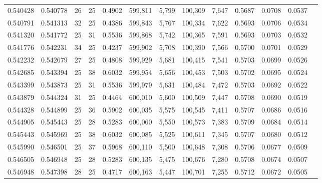 \begin{tabular}{rrrrrrrrrrrrr}
0.540428 & 0.540778 &    26 &  25 &                                     0.4902 & 599,811 &   5,799 & 100,309 &   7,647 & 0.5687 & 0.0708 & 0.0537 \\
0.540791 & 0.541313 &    32 &  25 &                                     0.4386 & 599,843 &   5,767 & 100,334 &   7,622 & 0.5693 & 0.0706 & 0.0534 \\
0.541320 & 0.541772 &    25 &  31 &                                     0.5536 & 599,868 &   5,742 & 100,365 &   7,591 & 0.5693 & 0.0703 & 0.0532 \\
0.541776 & 0.542231 &    34 &  25 &                                     0.4237 & 599,902 &   5,708 & 100,390 &   7,566 & 0.5700 & 0.0701 & 0.0529 \\
0.542232 & 0.542679 &    27 &  25 &                                     0.4808 & 599,929 &   5,681 & 100,415 &   7,541 & 0.5703 & 0.0699 & 0.0526 \\
0.542685 & 0.543394 &    25 &  38 &                                     0.6032 & 599,954 &   5,656 & 100,453 &   7,503 & 0.5702 & 0.0695 & 0.0524 \\
0.543399 & 0.543873 &    25 &  31 &                                     0.5536 & 599,979 &   5,631 & 100,484 &   7,472 & 0.5703 & 0.0692 & 0.0522 \\
0.543879 & 0.544324 &    31 &  25 &                                     0.4464 & 600,010 &   5,600 & 100,509 &   7,447 & 0.5708 & 0.0690 & 0.0519 \\
0.544328 & 0.544899 &    25 &  36 &                                     0.5902 & 600,035 &   5,575 & 100,545 &   7,411 & 0.5707 & 0.0686 & 0.0516 \\
0.544905 & 0.545443 &    25 &  28 &                                     0.5283 & 600,060 &   5,550 & 100,573 &   7,383 & 0.5709 & 0.0684 & 0.0514 \\
0.545443 & 0.545969 &    25 &  38 &                                     0.6032 & 600,085 &   5,525 & 100,611 &   7,345 & 0.5707 & 0.0680 & 0.0512 \\
0.545990 & 0.546501 &    25 &  37 &                                     0.5968 & 600,110 &   5,500 & 100,648 &   7,308 & 0.5706 & 0.0677 & 0.0509 \\
0.546505 & 0.546948 &    25 &  28 &                                     0.5283 & 600,135 &   5,475 & 100,676 &   7,280 & 0.5708 & 0.0674 & 0.0507 \\
0.546948 & 0.547398 &    28 &  25 &                                     0.4717 & 600,163 &   5,447 & 100,701 &   7,255 & 0.5712 & 0.0672 & 0.0505 \\

\end{tabular}
